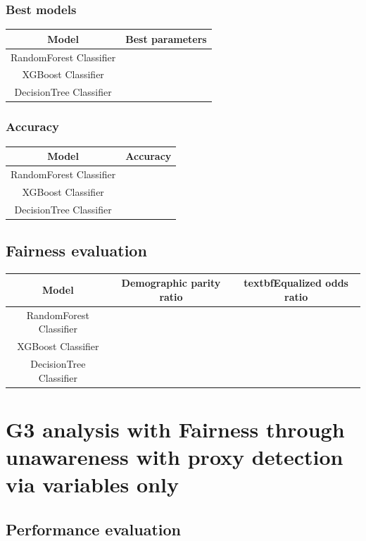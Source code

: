 \documentclass[12pt,a4paper,openright,twoside]{book}
\begin{document}
\subsubsection{Best models}

\begin{tabular}{|c|c|}
    \hline
    \textbf{Model} & \textbf{Best parameters} \\
    \hline
    RandomForest Classifier  &  \\
    \hline
    XGBoost Classifier & \\
    \hline
    DecisionTree Classifier & \\
    \hline
\end{tabular}

\subsubsection{Accuracy}

\begin{tabular}{|c|c|}
    \hline
    \textbf{Model} & \textbf{Accuracy} \\ 
    \hline
    RandomForest Classifier  &  \\
    \hline
    XGBoost Classifier & \\
    \hline
    DecisionTree Classifier & \\ 
    \hline
\end{tabular}

\subsection{Fairness evaluation}

\begin{tabular}{|c|c|c|}
    \hline
    \textbf{Model} & \textbf{Demographic parity ratio} & textbf{Equalized odds ratio} \\
    \hline
    RandomForest Classifier & & \\
    \hline
    XGBoost Classifier & & \\
    \hline
    DecisionTree Classifier & & \\
    \hline
\end{tabular}


\section{G3 analysis with Fairness through unawareness with proxy detection via variables only}

\subsection{Performance evaluation}
\end{document}
